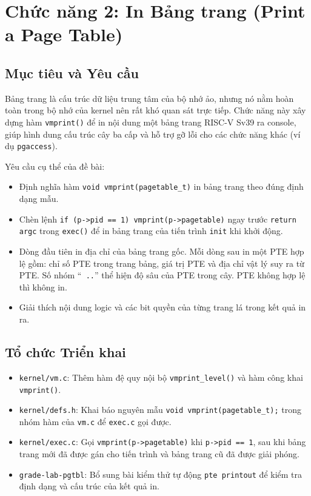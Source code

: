 \section{Chức năng 2: In Bảng trang (Print a Page Table)}

\subsection{Mục tiêu và Yêu cầu}
Bảng trang là cấu trúc dữ liệu trung tâm của bộ nhớ ảo, nhưng nó nằm hoàn toàn trong bộ nhớ của kernel nên rất khó quan sát trực tiếp. Chức năng này xây dựng hàm \texttt{vmprint()} để in nội dung một bảng trang RISC-V Sv39 ra console, giúp hình dung cấu trúc cây ba cấp và hỗ trợ gỡ lỗi cho các chức năng khác (ví dụ \texttt{pgaccess}).

Yêu cầu cụ thể của đề bài:
\begin{itemize}
    \item Định nghĩa hàm \texttt{void vmprint(pagetable\_t)} in bảng trang theo đúng định dạng mẫu.
    \item Chèn lệnh \texttt{if (p->pid == 1) vmprint(p->pagetable)} ngay trước \texttt{return argc} trong \texttt{exec()} để in bảng trang của tiến trình \texttt{init} khi khởi động.
    \item Dòng đầu tiên in địa chỉ của bảng trang gốc. Mỗi dòng sau in một PTE hợp lệ gồm: chỉ số PTE trong trang bảng, giá trị PTE và địa chỉ vật lý suy ra từ PTE. Số nhóm ``\texttt{ ..}'' thể hiện độ sâu của PTE trong cây. PTE không hợp lệ thì không in.
    \item Giải thích nội dung logic và các bit quyền của từng trang lá trong kết quả in ra.
\end{itemize}

\subsection{Tổ chức Triển khai}
\begin{itemize}
    \item \texttt{kernel/vm.c}: Thêm hàm đệ quy nội bộ \texttt{vmprint\_level()} và hàm công khai \texttt{vmprint()}.
    \item \texttt{kernel/defs.h}: Khai báo nguyên mẫu \texttt{void vmprint(pagetable\_t);} trong nhóm hàm của \texttt{vm.c} để \texttt{exec.c} gọi được.
    \item \texttt{kernel/exec.c}: Gọi \texttt{vmprint(p->pagetable)} khi \texttt{p->pid == 1}, sau khi bảng trang mới đã được gán cho tiến trình và bảng trang cũ đã được giải phóng.
    \item \texttt{grade-lab-pgtbl}: Bổ sung bài kiểm thử tự động \texttt{pte printout} để kiểm tra định dạng và cấu trúc của kết quả in.
\end{itemize}

